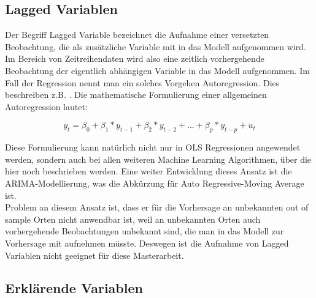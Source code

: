 \documentclass[a4paper,12pt]{thesis}
\begin{document}
\subsection{Lagged Variablen}

Der Begriff Lagged Variable bezeichnet die Aufnahme einer versetzten Beobachtung, die als zusätzliche Variable mit in das Modell aufgenommen wird. Im Bereich von Zeitreihendaten wird also eine zeitlich vorhergehende Beobachtung der eigentlich abhängigen Variable in das Modell aufgenommen. Im Fall der Regression nennt man ein solches Vorgehen Autoregression. Dies beschreiben z.B. \cite{Stock2015a}. Die mathematische Formulierung einer allgemeinen Autoregression lautet:

\begin{equation}
	\label{SVM:Autoregression}
	y_t = \beta_0 + \beta_1 * y_{t-1} + \beta_2 * y_{t-2} + ... + \beta_p * y_{t-p} + u_t
\end{equation}

Diese Formulierung kann natürlich nicht nur in OLS Regressionen angewendet werden, sondern auch bei allen weiteren Machine Learning Algorithmen, über die hier noch beschrieben werden. Eine weiter Entwicklung dieses Ansatz ist die ARIMA-Modellierung, was die Abkürzung für Auto Regressive-Moving Average ist.\\
Problem an diesem Ansatz ist, dass er für die Vorhersage an unbekannten out of sample Orten nicht anwendbar ist, weil an unbekannten Orten auch vorhergehende Beobachtungen unbekannt sind, die man in das Modell zur Vorhersage mit aufnehmen müsste. Deswegen ist die Aufnahme von Lagged Variablen nicht geeignet für diese Masterarbeit.

\subsection{Erklärende Variablen}
\end{document}
